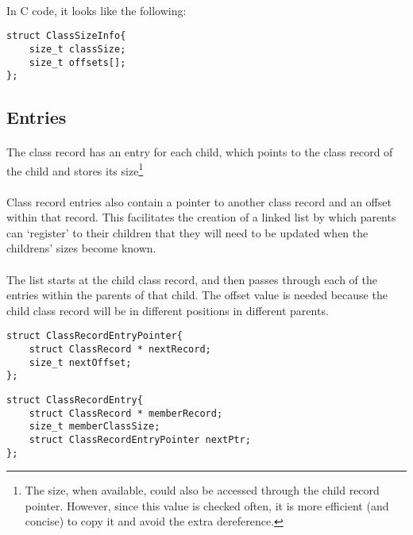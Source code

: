 \documentclass{article}
\begin{document}
\paragraph{}
In C code, it looks like the following:

\begin{lstlisting}
struct ClassSizeInfo{
	size_t classSize;
	size_t offsets[];
};
\end{lstlisting}

\subsection{Entries}

\paragraph{}
The class record has an entry for each child, which points to the class record of the child and stores its size\footnote{The size, when available, could also be accessed through the child record pointer. However, since this value is checked often, it is more efficient (and concise) to copy it and avoid the extra dereference.}

\paragraph{}
Class record entries also contain a pointer to another class record and an offset within that record. This facilitates the creation of a linked list by which parents can `register' to their children that they will need to be updated when the childrens' sizes become known.

\paragraph{}
The list starts at the child class record, and then passes through each of the entries within the parents of that child. The offset value is needed because the child class record will be in different positions in different parents.

\begin{lstlisting}
struct ClassRecordEntryPointer{
	struct ClassRecord * nextRecord;
	size_t nextOffset;
};
\end{lstlisting}

\begin{lstlisting}
struct ClassRecordEntry{
	struct ClassRecord * memberRecord;
	size_t memberClassSize;
	struct ClassRecordEntryPointer nextPtr;
};
\end{lstlisting}
\end{document}
